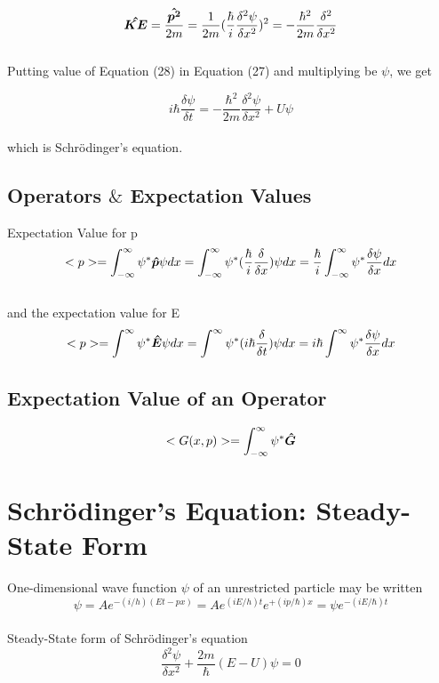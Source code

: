 \documentclass{article}
\begin{document}
\begin{equation}
    \vu*{KE}=\frac{\vu*{p^2}}{2m}=\frac{1}{2m}(\frac{\hbar}{i}\frac{\delta^2\psi}{\delta x^2})^2=-\frac{\hbar^2}{2m}\frac{\delta^2}{\delta x^2}
\end{equation}
\\
Putting value of Equation (28) in Equation (27) and multiplying be $\psi$, we get 

\begin{equation}
    i\hbar \frac{\delta \psi}{\delta t}=-\frac{\hbar^2}{2m}\frac{\delta^2\psi}{\delta x^2}+U\psi
\end{equation}
\\
which is Schrödinger’s equation.


\subsection*{Operators $\&$ Expectation Values}

Expectation Value for p
\begin{equation}
    <p>=\int_{-\infty}^{\infty}\psi^*\vu*{p}\psi dx=\int_{-\infty}^{\infty}\psi^*(\frac{\hbar}{i}\frac{\delta}{\delta x})\psi dx=\frac{\hbar}{i}\int_{-\infty}^{\infty}\psi^*\frac{\delta \psi}{\delta x}dx    
\end{equation}
\\
and the expectation value for E
\begin{equation}
    <p>=\int_{}^{\infty}\psi^*\vu*{E}\psi dx=\int_{}^{\infty}\psi^*(i\hbar\frac{\delta}{\delta t})\psi dx=i\hbar\int_{}^{\infty}\psi^*\frac{\delta \psi}{\delta x}dx 
\end{equation}

\subsection*{Expectation Value of an Operator}

\begin{equation}
    <G(x,p)>=\int_{-\infty}^{\infty}\psi^*\vu*{G}    
\end{equation}

\section*{Schrödinger’s Equation: Steady-State Form}
One-dimensional wave function $\psi$ of an unrestricted particle may be written  
\begin{equation}
    \psi=Ae^{-(i/h)(Et-px)}=Ae^{(iE/h)t}e^{+(ip/\hbar)x}=\psi e^{-(iE/\hbar)t}
\end{equation}
\\
Steady-State form of Schrödinger's equation
\begin{equation}
    \frac{\delta^2 \psi}{\delta x^2}+\frac{2m}{\hbar}(E-U)\psi=0
\end{equation}
\end{document}
